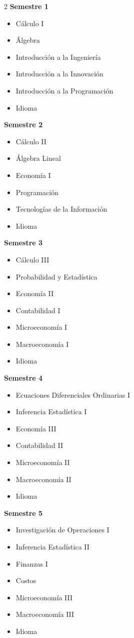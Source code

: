 \documentclass[12pt,a4paper]{article}
\begin{document}
	\begin{multicols}{2}
		\textbf{Semestre 1}
		\begin{itemize}
			\item Cálculo I
			\item Álgebra
			\item Introducción a la Ingeniería
			\item Introducción a la Innovación
			\item Introducción a la Programación
			\item Idioma
		\end{itemize}
		
		\textbf{Semestre 2}
		\begin{itemize}
			\item Cálculo II
			\item Álgebra Lineal
			\item Economía I
			\item Programación
			\item Tecnologías de la Información
			\item Idioma
		\end{itemize}
		
		\textbf{Semestre 3}
		\begin{itemize}
			\item Cálculo III
			\item Probabilidad y Estadística
			\item Economía II
			\item Contabilidad I
			\item Microeconomía I
			\item Macroeconomía I
			\item Idioma
		\end{itemize}
		
		\textbf{Semestre 4}
		\begin{itemize}
			\item Ecuaciones Diferenciales Ordinarias I
			\item Inferencia Estadística I
			\item Economía III
			\item Contabilidad II
			\item Microeconomía II
			\item Macroeconomía II
			\item Idioma
		\end{itemize}
		
		\textbf{Semestre 5}
		\begin{itemize}
			\item Investigación de Operaciones I
			\item Inferencia Estadística II
			\item Finanzas I
			\item Costos
			\item Microeconomía III
			\item Macroeconomía III
			\item Idioma
		\end{itemize}
		

\end{multicols}
\end{document}
